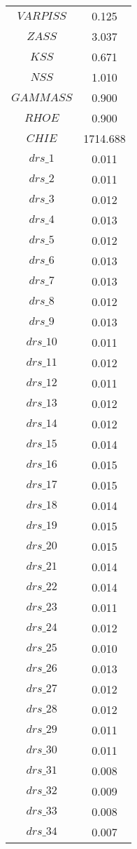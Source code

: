\begin{center}
\begin{longtable}{cc}
$VARPISS$ 	 & 	 0.125 \\
$ZASS$ 	 & 	 3.037 \\
$KSS$ 	 & 	 0.671 \\
$NSS$ 	 & 	 1.010 \\
$GAMMASS$ 	 & 	 0.900 \\
$RHOE$ 	 & 	 0.900 \\
$CHIE$ 	 & 	 1714.688 \\
$drs\_1$ 	 & 	 0.011 \\
$drs\_2$ 	 & 	 0.011 \\
$drs\_3$ 	 & 	 0.012 \\
$drs\_4$ 	 & 	 0.013 \\
$drs\_5$ 	 & 	 0.012 \\
$drs\_6$ 	 & 	 0.013 \\
$drs\_7$ 	 & 	 0.013 \\
$drs\_8$ 	 & 	 0.012 \\
$drs\_9$ 	 & 	 0.013 \\
$drs\_10$ 	 & 	 0.011 \\
$drs\_11$ 	 & 	 0.012 \\
$drs\_12$ 	 & 	 0.011 \\
$drs\_13$ 	 & 	 0.012 \\
$drs\_14$ 	 & 	 0.012 \\
$drs\_15$ 	 & 	 0.014 \\
$drs\_16$ 	 & 	 0.015 \\
$drs\_17$ 	 & 	 0.015 \\
$drs\_18$ 	 & 	 0.014 \\
$drs\_19$ 	 & 	 0.015 \\
$drs\_20$ 	 & 	 0.015 \\
$drs\_21$ 	 & 	 0.014 \\
$drs\_22$ 	 & 	 0.014 \\
$drs\_23$ 	 & 	 0.011 \\
$drs\_24$ 	 & 	 0.012 \\
$drs\_25$ 	 & 	 0.010 \\
$drs\_26$ 	 & 	 0.013 \\
$drs\_27$ 	 & 	 0.012 \\
$drs\_28$ 	 & 	 0.012 \\
$drs\_29$ 	 & 	 0.011 \\
$drs\_30$ 	 & 	 0.011 \\
$drs\_31$ 	 & 	 0.008 \\
$drs\_32$ 	 & 	 0.009 \\
$drs\_33$ 	 & 	 0.008 \\
$drs\_34$ 	 & 	 0.007 \\

\end{longtable}
\end{center}
